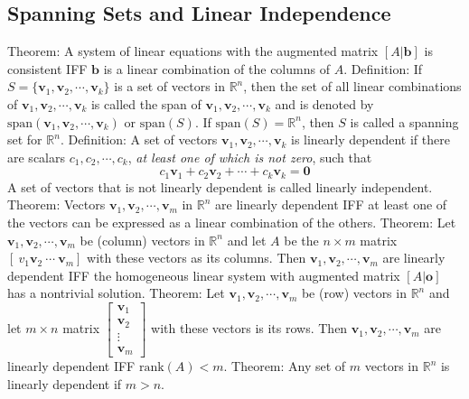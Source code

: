 \documentclass{article}
\begin{document}
        \subsection{Spanning Sets and Linear Independence}
        \begin{outline}
            \1 Theorem: A system of linear equations with the augmented matrix \([A|\mathbf b]\) is consistent IFF \(\mathbf b\) is a linear combination of the columns of \(A\). 
            \1 Definition: If \(S=\{\mathbf v_1,\mathbf v_2,\cdots,\mathbf v_k\}\) is a set of vectors in \(\mathbb R^n\), then the set of all linear combinations of \(\mathbf v_1,\mathbf v_2,\cdots,\mathbf v_k\) is called the span of \(\mathbf v_1,\mathbf v_2,\cdots,\mathbf v_k\) and is denoted by \(\text{span}(\mathbf v_1,\mathbf v_2,\cdots,\mathbf v_k)\) or \(\text{span}(S)\). If \(\text{span}(S)=\mathbb R^n\), then $S$ is called a spanning set for \(\mathbb R^n\). 
            \1 Definition: A set of vectors \(\mathbf v_1,\mathbf v_2,\cdots,\mathbf v_k\) is linearly dependent if there are scalars \(c_1,c_2,\cdots,c_k\), \textit{at least one of which is not zero}, such that \[c_1\mathbf v_1+c_2\mathbf v_2+\cdots+c_k\mathbf v_k=\mathbf 0\] A set of vectors that is not linearly dependent is called linearly independent. 
            \1 Theorem: Vectors \(\mathbf v_1,\mathbf v_2,\cdots,\mathbf v_m\) in \(\mathbb R^n\) are linearly dependent IFF at least one of the vectors can be expressed as a linear combination of the others. 
            \1 Theorem: Let \(\mathbf v_1,\mathbf v_2,\cdots,\mathbf v_m\) be (column) vectors in \(\mathbb{R}^n\) and let $A$ be the \(n\times m\) matrix \([\mathbf\:v_1\mathbf v_2\:\cdots\:\mathbf v_m]\) with these vectors as its columns. Then \(\mathbf v_1,\mathbf v_2,\cdots,\mathbf v_m\) are linearly dependent IFF the homogeneous linear system with augmented matrix \([A|\mathbf o]\) has a nontrivial solution. 
            \1 Theorem: Let \(\mathbf v_1,\mathbf v_2,\cdots,\mathbf v_m\) be (row) vectors in \(\mathbb R^n\) and let \(m\times n\) matrix $\begin{bmatrix}
                \mathbf v_1\\\mathbf v_2\\\vdots\\\mathbf v_m
            \end{bmatrix}$ with these vectors is its rows. Then \(\mathbf v_1,\mathbf v_2,\cdots,\mathbf v_m\) are linearly dependent IFF \(\text{rank}(A)<m\). 
            \1 Theorem: Any set of $m$ vectors in \(\mathbb R^n\) is linearly dependent if \(m>n\). 

        \end{outline}
\end{document}
